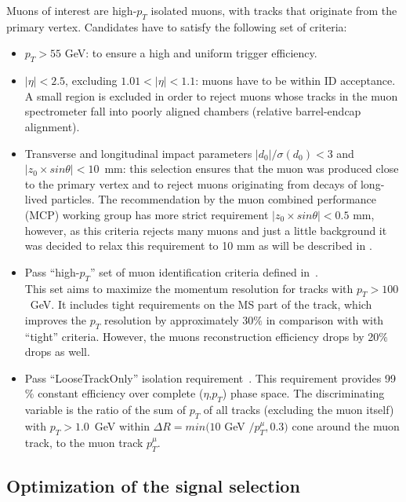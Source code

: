 Muons of interest are high-$p_T$ isolated muons, with tracks that originate
from the primary vertex. Candidates have to satisfy the following set of criteria:
\begin{itemize}
 \item $p_T > 55$ GeV: to ensure a high and uniform trigger efficiency.
 \item $|\eta|<2.5$, excluding $1.01 < |\eta| < 1.1$: muons have to be within ID acceptance. 
 A small region is excluded in order to reject muons whose tracks in the muon spectrometer fall into poorly aligned chambers (relative barrel-endcap alignment).
 \item Transverse and longitudinal impact parameters $|d_0|/\sigma(d_0)<3$ and $|z_0\times sin\theta|<10$~mm: 
 this selection ensures that the muon was produced close to the primary vertex and to reject muons originating from decays of long-lived particles. The recommendation by the muon combined performance (MCP) working group has
 more strict requirement $|z_0 \times sin \theta| < 0.5$ mm, however, as this criteria rejects many muons and just a little background it  
 was decided to relax this requirement to 10 mm as will be described in .
 \item Pass ``high-$p_T$'' set of muon identification criteria defined in~\cite{muon_performance_2015}. \\ 
 This set aims to maximize the momentum resolution for tracks with $p_T > 100$~GeV.
 It includes tight requirements on the MS part of the track, 
 which improves the $p_T$ resolution by approximately 30$\%$ in comparison with with ``tight'' criteria.  However, the muons reconstruction efficiency drops by 20$\%$ drops as well.
 \item Pass ``LooseTrackOnly'' isolation requirement~\cite{muon_performance_2015}. 
 This requirement provides 99$\%$ constant efficiency over complete ($\eta$,$p_T$) phase space.
 The discriminating variable is the ratio of the sum of $p_T$ of all tracks (excluding the muon itself) with $p_T > 1.0$~GeV within $\Delta R = min(10$ GeV $/p_T^{\mu}, 0.3)$ 
 cone around the muon track, to the muon track $p_T^{\mu}$.
\end{itemize}  
 
\subsection{Optimization of the signal selection}
\label{subsec:wprime_cut_optimization}

